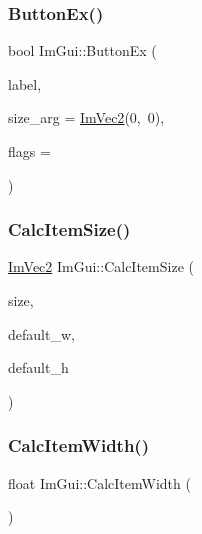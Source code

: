 \mbox{\label{namespaceImGui_ae479220c66b039874c6e4c9e9b22849f}} 
\subsubsection{\texorpdfstring{Button\+Ex()}{ButtonEx()}}
{\footnotesize\ttfamily bool Im\+Gui\+::\+Button\+Ex (\begin{DoxyParamCaption}\item[{const char $\ast$}]{label,  }\item[{const \hyperlink{structImVec2}{Im\+Vec2} \&}]{size\+\_\+arg = {\ttfamily \hyperlink{structImVec2}{Im\+Vec2}(0,~0)},  }\item[{Im\+Gui\+Button\+Flags}]{flags = {} }\end{DoxyParamCaption})}

\mbox{\label{namespaceImGui_acaef0497f7982dd98bf215e50129cd9b}} 
\subsubsection{\texorpdfstring{Calc\+Item\+Size()}{CalcItemSize()}}
{\footnotesize\ttfamily \hyperlink{structImVec2}{Im\+Vec2} Im\+Gui\+::\+Calc\+Item\+Size (\begin{DoxyParamCaption}\item[{\hyperlink{structImVec2}{Im\+Vec2}}]{size,  }\item[{float}]{default\+\_\+w,  }\item[{float}]{default\+\_\+h }\end{DoxyParamCaption})}

\mbox{\label{namespaceImGui_ab3b3ba92ebd8bca4a552dd93321a1994}} 
\subsubsection{\texorpdfstring{Calc\+Item\+Width()}{CalcItemWidth()}}
{\footnotesize\ttfamily float Im\+Gui\+::\+Calc\+Item\+Width (\begin{DoxyParamCaption}{ }\end{DoxyParamCaption})}

